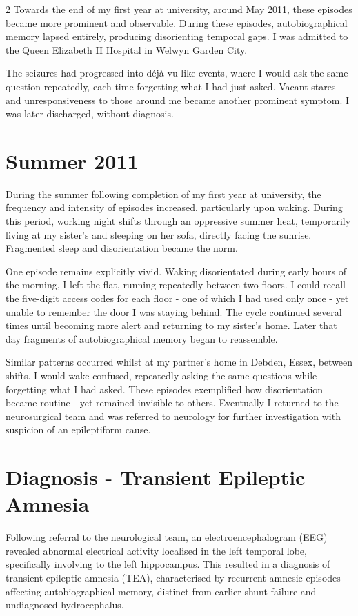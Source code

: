 \documentclass{article}
\begin{document}
\begin{multicols}{2}
Towards the end of my first year at university, around May 2011, these episodes became more prominent and observable. During these episodes, autobiographical memory lapsed entirely, producing disorienting temporal gaps. I was admitted to the Queen Elizabeth II Hospital in Welwyn Garden City.

The seizures had progressed into déjà vu-like events, where I would ask the same question repeatedly, each time forgetting what I had just asked. Vacant stares and unresponsiveness to those around me became another prominent symptom. I was later discharged, without diagnosis.

\section*{Summer 2011}
During the summer following completion of my first year at university, the frequency and intensity of episodes increased. particularly upon waking. During this period, working night shifts through an oppressive summer heat, temporarily living at my sister’s and sleeping on her sofa, directly facing the sunrise. Fragmented sleep and disorientation became the norm.

One episode remains explicitly vivid. Waking disorientated during early hours of the morning, I left the flat, running repeatedly between two floors. I could recall the five-digit access codes for each floor - one of which I had used only once - yet unable to remember the door I was staying behind. The cycle continued several times until becoming more alert and returning to my sister's home. Later that day fragments of autobiographical memory began to reassemble.

Similar patterns occurred whilst at my partner’s home in Debden, Essex, between shifts. I would wake confused, repeatedly asking the same questions while forgetting what I had asked. These episodes exemplified how disorientation became routine - yet remained invisible to others. Eventually I returned to the neurosurgical team and was referred to neurology for further investigation with suspicion of an epileptiform cause.

\section*{Diagnosis - Transient Epileptic Amnesia}
Following referral to the neurological team, an electroencephalogram (EEG) revealed abnormal electrical activity localised in the left temporal lobe, specifically involving to the left hippocampus. This resulted in a diagnosis of transient epileptic amnesia (TEA), characterised by recurrent amnesic episodes affecting autobiographical memory, distinct from earlier shunt failure and undiagnosed hydrocephalus.\cite{zeman1998,butler2007}


\end{multicols}
\end{document}
